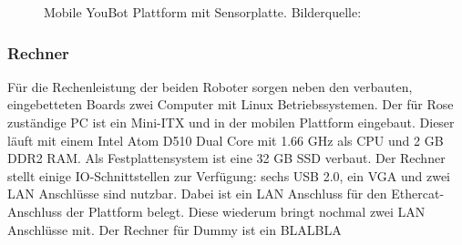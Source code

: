  \begin{figure}[H]
 	\centering
 	\caption{Mobile YouBot Plattform mit Sensorplatte. Bilderquelle:\cite{kuka2015}}
 	\label{fig:basic-aufbau-youbot-base-full}
 \end{figure}

\subsubsection{Rechner}
Für die Rechenleistung der beiden Roboter sorgen neben den verbauten, eingebetteten Boards zwei Computer mit Linux Betriebssystemen.
Der für Rose zuständige PC ist ein Mini-ITX und in der mobilen Plattform eingebaut. Dieser läuft mit einem Intel Atom D510 Dual Core mit 1.66 GHz als CPU und 2 GB DDR2 RAM. Als Festplattensystem ist eine 32 GB SSD verbaut. Der Rechner stellt einige IO-Schnittstellen zur Verfügung: sechs USB 2.0, ein VGA und zwei LAN Anschlüsse sind nutzbar. Dabei ist ein LAN Anschluss für den Ethercat-Anschluss der Plattform belegt. Diese wiederum bringt nochmal zwei LAN Anschlüsse mit. Der Rechner für Dummy ist ein BLALBLA %

